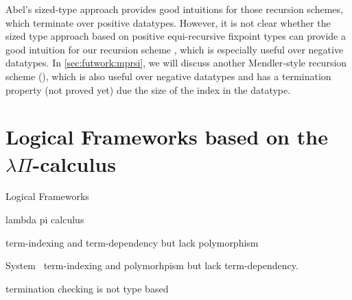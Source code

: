 Abel's sized-type approach provides good intuitions for those recursion schemes,
which terminate over positive datatypes. However, it is not clear whether
the sized type approach based on positive equi-recursive fixpoint types
can provide a good intuition for our recursion scheme \MsfIt, which is
especially useful over negative datatypes. In \ref{sec:futwork:mprsi},
we will discuss another Mendler-style recursion scheme (\mprsi), which is
also useful over negative datatypes and has a termination property
(not proved yet) due the size of the index in the datatype.

\section{Logical Frameworks based on the $\lambda\Pi$-calculus}

Logical Frameworks

lambda pi calculus

term-indexing and term-dependency 
but lack polymorphism

System \Fi\
term-indexing and polymorhpism
but lack term-dependency.


termination checking is not type based


